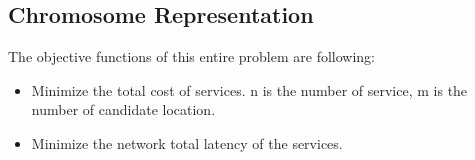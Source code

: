 \documentclass[11pt, a4paper, oneside, openright]{article}
\begin{document}
\subsection{Chromosome Representation}
The objective functions of this entire problem are following:
\begin{itemize}
	\item Minimize the total cost of services. n is the number of service, m is the number of candidate location.
	\item Minimize the network total latency of the services.
\end{itemize}
\section{}
\section{}
\backmatter

%


\end{document}
